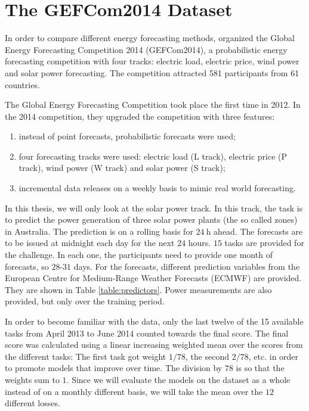 \section{The GEFCom2014 Dataset}
\label{sec:gefcom-dataset}

In order to compare different energy forecasting methods, 
\Textcite{Hong2016} organized the Global Energy Forecasting Competition 2014 (GEFCom2014), 
a probabilistic energy forecasting competition with four tracks: 
electric load, electric price, wind power and solar power forecasting. 
The competition attracted 581 participants from 61 countries. 

The Global Energy Forecasting Competition took place the first time in 2012. 
In the 2014 competition, they upgraded the competition with three features: 
\begin{enumerate}
    \item instead of point forecasts, probabilistic forecasts were used;
    \item four forecasting tracks were used: electric load (L track), 
    electric price (P track), wind power (W track) and solar power (S track);
    \item incremental data releases on a weekly basis to mimic real world forecasting.
\end{enumerate}

In this thesis, we will only look at the solar power track. 
In this track, the task is to predict the power generation of three 
solar power plants (the so called zones) in Australia. 
The prediction is on a rolling basis for \(\SI{24}{\hour}\) ahead. 
The forecasts are to be issued at midnight each day for the next \(24\) hours. 
\(15\) tasks are provided for the challenge. In each one, the participants need to 
provide one month of forecasts, so \(28\)-\(31\) days.
For the forecasts, different prediction variables from the 
European Centre for Medium-Range Weather Forecasts (ECMWF) are provided. 
They are shown in Table \ref{table:predictors}.
Power measurements are also provided, but only over the training period. 

In order to become familiar with the data, only the last twelve of the 15 available tasks 
from April 2013 to June 2014 counted towards the final score.
The final score was calculated using a linear increasing weighted mean over the scores from the different tasks: 
The first task got weight \(1/78\), the second \(2/78\), etc. 
in order to promote models that improve over time. The division by \(78\) is so that the 
weights sum to \(1\).
Since we will evaluate the models on the dataset as a whole instead of on a monthly different basis, 
we will take the mean over the \(12\) different losses.

